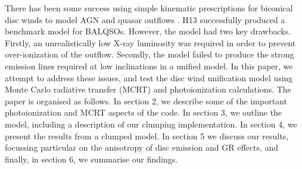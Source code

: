 \documentclass[useAMS,usenatbib]{mn2e_x}
\begin{document}
There has been some success using simple
kinematic prescriptions for biconical disc winds to model 
AGN and quasar outflows \citep[][hereafter H13]{simlong2008,sim2010,higginbottom2013}. 
H13 successfully produced a benchmark model for BALQSOs. However, the model
had two key drawbacks. Firstly, an unrealistically low X-ray luminosity
was required in order to prevent over-ionization of the outflow.
Secondly, the model failed to produce the strong emission lines 
required at low inclinations in a unified model.
In this paper, we attempt to address these issues, and test the disc wind 
unification model using Monte Carlo radiative transfer (MCRT) and photoionization 
calculations. The paper is organised as follows.
In section 2, we describe some of the important photoionization 
and MCRT aspects of the code. In section 3, we outline the model, including 
a description of our clumping implementation. In section 4, we present the results 
from a clumped model. In section 5 we discuss our results, 
focussing particular on the anisotropy of 
disc emission and GR effects, and finally, in section 6, we summarise our findings.






\end{document}
